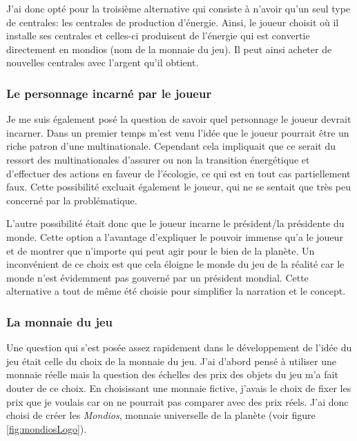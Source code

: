 \documentclass{article}
\begin{document}
        
        J'ai donc opté pour la troisième alternative qui consiste à n'avoir qu'un seul type de centrales: les centrales de production d'énergie. Ainsi, le joueur choisit où il installe ses centrales et celles-ci produisent de l'énergie qui est convertie directement en mondios (nom de la monnaie du jeu). Il peut ainsi acheter de nouvelles centrales avec l'argent qu'il obtient.
        
        \subsubsection{Le personnage incarné par le joueur}
        Je me suis également posé la question de savoir quel personnage le joueur devrait incarner. Dans un premier temps m'est venu l'idée que le joueur pourrait être un riche patron d'une multinationale. Cependant cela impliquait que ce serait du ressort des multinationales d'assurer ou non la transition énergétique et d'effectuer des actions en faveur de l'écologie, ce qui est en tout cas partiellement faux. Cette possibilité excluait également le joueur, qui ne se sentait que très peu concerné par la problématique.
        
        
        L'autre possibilité était donc que le joueur incarne le président/la présidente du monde. Cette option a l'avantage d'expliquer le pouvoir immense qu'a le joueur et de montrer que n'importe qui peut agir pour le bien de la planète.
        Un inconvénient de ce choix est que cela éloigne le monde du jeu de la réalité car le monde n'est évidemment pas gouverné par un président mondial. Cette alternative a tout de même été choisie pour simplifier la narration et le concept.
        

		\subsubsection{La monnaie du jeu}
		Une question qui s'est posée assez rapidement dans le développement de l'idée du jeu était celle du choix de la monnaie du jeu. J'ai d'abord pensé à utiliser une monnaie réelle mais la question des échelles des prix des objets du jeu m'a fait douter de ce choix. En choisissant une monnaie fictive, j'avais le choix de fixer les prix que je voulais car on ne pourrait pas comparer avec des prix réels.
		J'ai donc choisi de créer les \textit{Mondios}, monnaie universelle de la planète (voir figure \ref{fig:mondiosLogo}).
		
\end{document}
